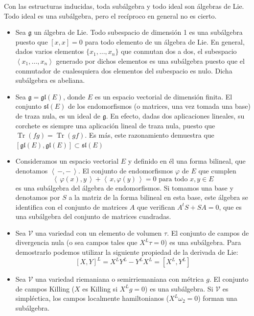\documentclass[a4paper,draft,12pt]{scrartcl}
\newcommand{\g}{\mathfrak{g}}%
\newcommand{\escalar}[2]{\left\langle\, #1,#2\, \right\rangle}  %
\newcommand{\df}[1]{\textsf{\color{blue}#1}}
\DeclareMathOperator{\Traza}{Tr}  %
\begin{document}
Con las estructuras inducidas, toda subálgebra y todo ideal son  álgebras de Lie. Todo ideal  es una subálgebra, pero el recíproco en general no es cierto.
 
 \bigskip


\begin{itemize}

\item Sea $\g$ un álgebra de Lie.  Todo subespacio de dimensión 1 es una subálgebra puesto que $[x,x]=0$ para todo elemento de un álgebra de Lie. En general, dados varios elementos $\{x_1, \dots ,x_n\}$ que conmutan dos a dos, el subespacio $\left\langle x_1, \dots, x_n \right \rangle$ generado por dichos elementos es una subálgebra puesto que el conmutador de cualesquiera dos elementos del subespacio es nulo.  Dicha subálgebra  es abeliana. 


\item Sea  $\g = \mathfrak{gl} (E)$, donde $E$ es un espacio vectorial de dimensión finita. El conjunto  $\mathfrak{sl}(E)$ de los endomorfismos (o matrices, una vez tomada una base) de traza nula, es un ideal de  $\g$. En efecto, dadas dos aplicaciones lineales, su corchete es siempre una aplicación lineal de traza nula, puesto que $\Traza(fg)= \Traza(gf)$. Es más, este razonamiento demuestra que $[\mathfrak{gl}(E),\mathfrak{gl}(E)] \subset \mathfrak{sl}(E)$

\item Consideramos un espacio vectorial $E$ y definido en él una forma bilineal, que denotamos $\escalar{-}{-}$. El conjunto de endomorfismos $\varphi$ de $E$ que cumplen
\[
\escalar{\varphi(x)}{y} + \escalar{x}{\varphi(y)} = 0 \text{ para todo } x,y \in E
\]
es una subálgebra del álgebra de endomorfismos.  Si tomamos una base y denotamos por $S$ a la matriz de la forma bilineal en esta base, este álgebra se identifica con el conjunto de matrices $A$ que verifican $A^tS+SA=0$, que es una subálgebra del conjunto de matrices cuadradas.


\item Sea  $\mathcal{V}$  una variedad con un elemento de volumen $\tau$.  El conjunto de campos de  \df{divergencia}  nula (o sea campos tales que $X^L \tau  = 0$) es una subálgebra. Para demostrarlo podemos utilizar la siguiente propiedad de la derivada de Lie:
\[
[X,Y]^L = X^L Y^L - Y^L X^L= [X^L, Y^L]
\]

\item Sea  $\mathcal{V}$  una variedad riemaniana o semirriemaniana con métrica  $g$. El conjunto de  \df{campos Killing}  ($X$ es Killing si $X^L g = 0$) es una subálgebra. Si   $\mathcal{V}$ es simpléctica, los  \df{campos localmente hamiltonianos}  ($X^L \omega_2 = 0$) forman una subálgebra.


\end{itemize}
\end{document}
